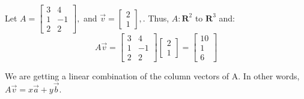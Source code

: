 \documentclass[../main.tex]{subfiles}
\begin{document}
\begin{example}
    Let \( A = \begin{bmatrix}
        3 & 4 \\
        1 & -1 \\
        2 & 2 
    \end{bmatrix}, \) and \( \vec{v} = \begin{bmatrix}
        2 \\
        1
    \end{bmatrix}, \).
    Thus, \( A: \mathbf{R}^2 \) to \( \mathbf{R}^3 \) and:
    \[ A\vec{v} = \begin{bmatrix}
        3 & 4 \\
        1 & -1 \\
        2 & 2 
    \end{bmatrix} \begin{bmatrix}
        2 \\
        1
    \end{bmatrix} = \begin{bmatrix}
        10 \\
        1 \\
        6
    \end{bmatrix} \]

    \begin{note}
        We are getting a linear combination of the column vectors of A.
        In other words, \( A \vec{v} = x \vec{a}+ y \vec{b} \).
    \end{note}
\end{example}
\end{document}
